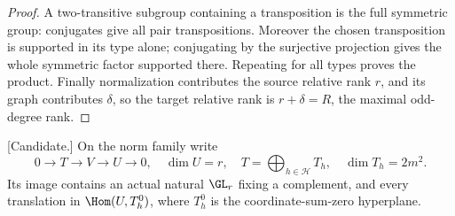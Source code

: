 \begin{proof}
A two-transitive subgroup containing a transposition is the full
symmetric group: conjugates give all pair transpositions.
Moreover the chosen transposition is supported in its type alone;
conjugating by the surjective projection gives the whole symmetric
factor supported there. Repeating for all types proves the product.
Finally normalization contributes the source relative rank $r$,
and its graph contributes $\delta$, so the target relative rank
is $r+\delta=R$, the maximal odd-degree rank.
\end{proof}

\begin{proposition}
\label{prop:good-theta-uniform-gluing-candidate}
\textup{[Candidate.]}
On the norm family write
\[
 0\longrightarrow T\longrightarrow V\longrightarrow U\longrightarrow0,
 \quad\dim U=r,\quad
 T=\bigoplus_{h\in\mathcal H}T_h,\quad\dim T_h=2m^2.
\]
Its image contains an actual natural $\GL_r$ fixing a complement,
and every translation in $\Hom(U,T_h^0)$, where $T_h^0$ is the
coordinate-sum-zero hyperplane.
\end{proposition}
